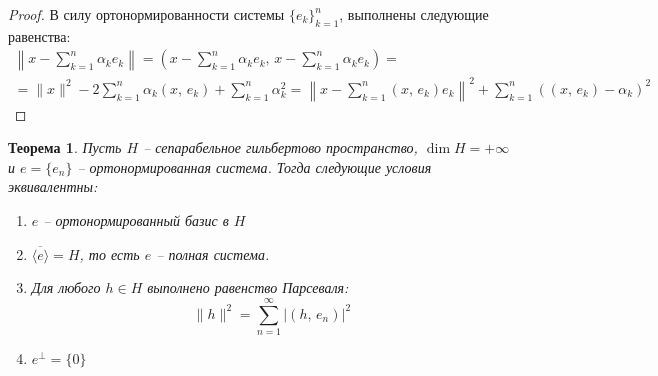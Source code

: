 \documentclass[a4paper,12pt]{article}
\theoremstyle{plain}
\newtheorem{theorem}{Теорема}[section]
\theoremstyle{definition}
\theoremstyle{remark}
\begin{document}
\begin{proof}
  В силу ортонормированности системы $\{e_k\}_{k = 1}^n$, выполнены следующие равенства:
  \begin{align*}
    \left\|x - \sum_{k=1}^n \alpha_ke_k\right\| = \left(x - \sum_{k = 1}^n\alpha_ke_k,\, x - \sum_{k = 1}^n \alpha_ke_k\right) = \\
    = \|x\|^2 - 2\sum_{k = 1}^n \alpha_k(x,\,e_k) + \sum_{k = 1}^n \alpha_k^2 = \left\|x - \sum_{k = 1}^n (x,\, e_k)e_k\right\|^2 + \sum_{k = 1}^n ((x,\, e_k) - \alpha_k)^2
  \end{align*}
\end{proof}

\begin{theorem}
	Пусть $H$ -- сепарабельное гильбертово пространство, $\dim H = +\infty$ и $e = \{e_n\}$ -- ортонормированная система. Тогда следующие условия эквивалентны:
	\begin{enumerate}
		\item $e$ -- ортонормированный базис в $H$
		\item $\overline{\langle e\rangle} = H$, то есть $e$ -- полная система.
		\item Для любого $h \in H$ выполнено равенство Парсеваля:
		      \[
			      \|h\|^2 = \sum_{n = 1}^\infty \vert (h,\, e_n)\vert^2
		      \]
		\item $e^\bot = \{0\}$
	\end{enumerate}
\end{theorem}
\end{document}

